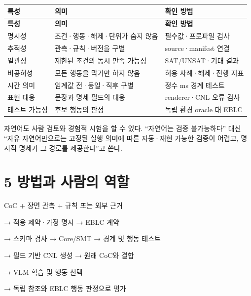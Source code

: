 \documentclass[11pt,a4paper]{article}
\begin{document}
\begingroup\small
\begin{longtable}{@{}>{\raggedright\arraybackslash}p{}>{\raggedright\arraybackslash}p{}>{\raggedright\arraybackslash}p{}@{}}
\toprule
\textbf{특성} & \textbf{의미} & \textbf{확인 방법} \\
\midrule\endfirsthead
\toprule
\textbf{특성} & \textbf{의미} & \textbf{확인 방법} \\
\midrule\endhead
\bottomrule\endfoot
명시성 & 조건·행동·해제·단위가 숨지 않음 & 필수값·프로파일 검사 \\
추적성 & 관측·규칙·버전을 구별 & source·manifest 연결 \\
일관성 & 제한된 조건의 동시 만족 가능성 & SAT/UNSAT·기대 결과 \\
비공허성 & 모든 행동을 막기만 하지 않음 & 허용 사례·해제·진행 지표 \\
시간 의미 & 임계값 전·동일·직후 구별 & 정수 ms 경계 테스트 \\
표현 대응 & 문장과 명세 필드의 대응 & renderer·CNL 오류 검사 \\
테스트 가능성 & 후보 행동의 판정 & 독립 환경 oracle 대 EBLC \\
\end{longtable}
\endgroup

자연어도 사람 검토와 경험적 시험을 할 수 있다. “자연어는 검증 불가능하다” 대신 “자유 자연어만으로는 고정된 실행 의미에 따른 자동·재현 가능한 검증이 어렵고, 명시적 명세가 그 경로를 제공한다”고 쓴다.\par

\clearpage{}\section*{5 방법과 사람의 역할}

\begingroup\small\ttfamily\setlength{\parskip}{1pt}
\noindent\hspace*{0.0em}CoC + 장면 관측 + 규칙 또는 외부 근거\par
\noindent\hspace*{1.0em}→ 적용 제약·가정 명시 → EBLC 계약\par
\noindent\hspace*{1.0em}→ 스키마 검사 → Core/SMT → 경계 및 행동 테스트\par
\noindent\hspace*{1.0em}→ 필드 기반 CNL 생성 → 원래 CoC와 결합\par
\noindent\hspace*{1.0em}→ VLM 학습 및 행동 선택\par
\noindent\hspace*{1.0em}→ 독립 참조와 EBLC 행동 판정으로 평가\par\endgroup\par
\end{document}
